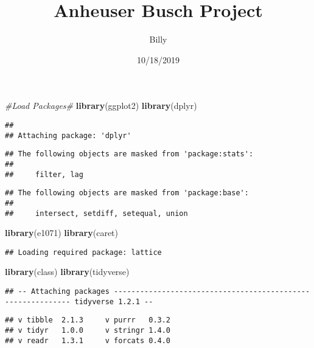 \documentclass[]{article}
\title{Anheuser Busch Project}
\author{Billy}
\date{10/18/2019}
\newenvironment{Shaded}{\begin{snugshade}}{\end{snugshade}}
\newcommand{\CommentTok}[1]{\textcolor[rgb]{0.56,0.35,0.01}{\textit{#1}}}
\newcommand{\KeywordTok}[1]{\textcolor[rgb]{0.13,0.29,0.53}{\textbf{#1}}}
\newcommand{\NormalTok}[1]{#1}
\begin{document}
\maketitle

\begin{Shaded}
\begin{Highlighting}[]
\CommentTok{#Load Packages#}
\KeywordTok{library}\NormalTok{(ggplot2)}
\KeywordTok{library}\NormalTok{(dplyr)}
\end{Highlighting}
\end{Shaded}

\begin{verbatim}
## 
## Attaching package: 'dplyr'
\end{verbatim}

\begin{verbatim}
## The following objects are masked from 'package:stats':
## 
##     filter, lag
\end{verbatim}

\begin{verbatim}
## The following objects are masked from 'package:base':
## 
##     intersect, setdiff, setequal, union
\end{verbatim}

\begin{Shaded}
\begin{Highlighting}[]
\KeywordTok{library}\NormalTok{(e1071)}
\KeywordTok{library}\NormalTok{(caret)}
\end{Highlighting}
\end{Shaded}

\begin{verbatim}
## Loading required package: lattice
\end{verbatim}

\begin{Shaded}
\begin{Highlighting}[]
\KeywordTok{library}\NormalTok{(class)}
\KeywordTok{library}\NormalTok{(tidyverse)}
\end{Highlighting}
\end{Shaded}

\begin{verbatim}
## -- Attaching packages ------------------------------------------------------------ tidyverse 1.2.1 --
\end{verbatim}

\begin{verbatim}
## v tibble  2.1.3     v purrr   0.3.2
## v tidyr   1.0.0     v stringr 1.4.0
## v readr   1.3.1     v forcats 0.4.0
\end{verbatim}
\end{document}
